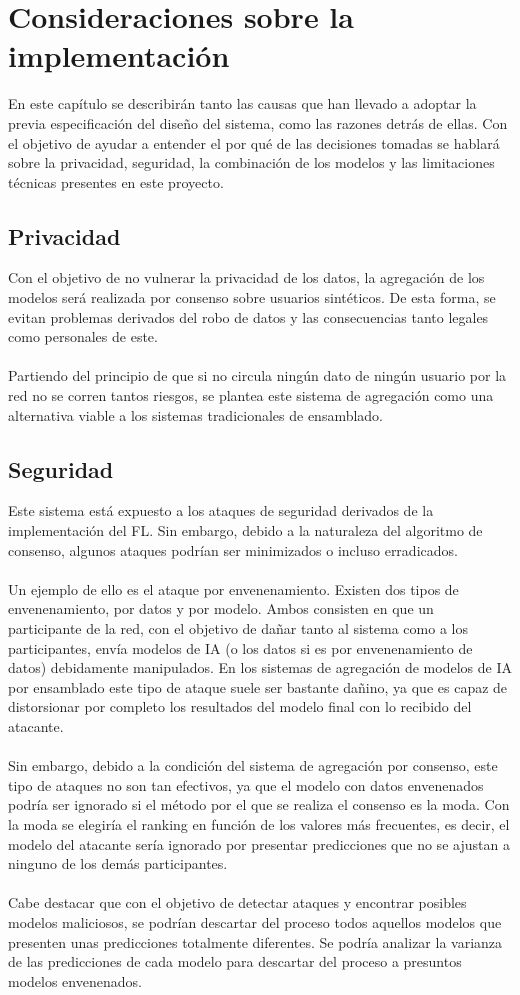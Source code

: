 \section{Consideraciones sobre la implementación}
En este capítulo se describirán tanto las causas que han llevado a adoptar la previa especificación del diseño del sistema, como las razones detrás de ellas. Con el objetivo de ayudar a entender el por qué de las decisiones tomadas se hablará sobre la privacidad, seguridad, la combinación de los modelos y las limitaciones técnicas presentes en este proyecto.
\subsection{Privacidad}
Con el objetivo de no vulnerar la privacidad de los datos, la agregación de los modelos será realizada por consenso sobre usuarios sintéticos. De esta forma, se evitan problemas derivados del robo de datos y las consecuencias tanto legales como personales de este.
\\ \\
Partiendo del principio de que si no circula ningún dato de ningún usuario por la red no se corren tantos riesgos, se plantea este sistema de agregación como una alternativa viable a los sistemas tradicionales de ensamblado.

\subsection{Seguridad}
Este sistema está expuesto a los ataques de seguridad derivados de la implementación del FL. Sin embargo, debido a la naturaleza del algoritmo de consenso, algunos ataques podrían ser minimizados o incluso erradicados.
\\ \\
Un ejemplo de ello es el ataque por envenenamiento. Existen dos tipos de envenenamiento, por datos y por modelo. Ambos consisten en que un participante de la red, con el objetivo de dañar tanto al sistema como a los participantes, envía modelos de IA (o los datos si es por envenenamiento de datos) debidamente manipulados. En los sistemas de agregación de modelos de IA por ensamblado este tipo de ataque suele ser bastante dañino, ya que es capaz de distorsionar por completo los resultados del modelo final con lo recibido del atacante.
\\ \\
Sin embargo, debido a la condición del sistema de agregación por consenso, este tipo de ataques no son tan efectivos, ya que el modelo con datos envenenados podría ser ignorado si el método por el que se realiza el consenso es la moda. Con la moda se elegiría el ranking en función de los valores más frecuentes, es decir, el modelo del atacante sería ignorado por presentar predicciones que no se ajustan a ninguno de los demás participantes.
\\ \\
Cabe destacar que con el objetivo de detectar ataques y encontrar posibles modelos maliciosos, se podrían descartar del proceso todos aquellos modelos que presenten unas predicciones totalmente diferentes. Se podría analizar la varianza de las predicciones de cada modelo para descartar del proceso a presuntos modelos envenenados.

